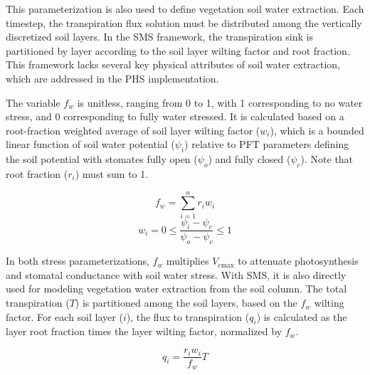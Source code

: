 \documentclass[draft,linenumbers]{agujournal}
\begin{document}
    This parameterization is also used to define vegetation soil water extraction. 
    Each timestep, the transpiration flux solution must be distributed among the vertically discretized soil layers.
    In the SMS framework, the transpiration sink is partitioned by layer according to the soil layer wilting factor and root fraction.
    This framework lacks several key physical attributes of soil water extraction, which are addressed in the PHS implementation.
    
    The variable $f_w$ is unitless, ranging from 0 to 1, with 1 corresponding to no water stress, and 0 corresponding to fully water stressed. 
    It is calculated based on a root-fraction weighted average of soil layer wilting factor ($w_i$), which is a bounded linear 
    function of soil water potential ($\psi_i$) relative to PFT parameters defining the soil potential with stomates fully open ($
    \psi_{o}$) and fully closed ($\psi_{c}$). Note that root fraction ($r_i$) must sum to 1.
    
    \begin{linenomath*}
    \begin{equation} f_w = \sum_{i=1}^{n}{r_iw_i}
    \label{bt:1}
    \end{equation}
    \begin{equation} 
    \label{bt:2}
    w_i=0 \leq \dfrac{\psi_i-\psi_{c}}{\psi_{o}-\psi_{c}} \leq 1
    \end{equation}
    \end{linenomath*}
    
    In both stress parameterizations, $f_w$ multiplies $V_{\text{cmax}}$ to attenuate photosynthesis and stomatal conductance with soil water stress. 
    With SMS, it is also directly used for modeling vegetation water extraction from the soil column. 
    The total transpiration ($T$) is partitioned among the soil layers, based on the $f_w$ wilting factor. 
    For each soil layer ($i$), the flux to transpiration ($q_i$) is calculated as the layer root fraction times the layer wilting factor, normalized by $f_w$. 

    \begin{linenomath*}
    \begin{equation}
    \label{bt:4}
    q_i = \dfrac{r_i w_i}{f_w}T
    \end{equation}
    \end{linenomath*}
    
\end{document}
